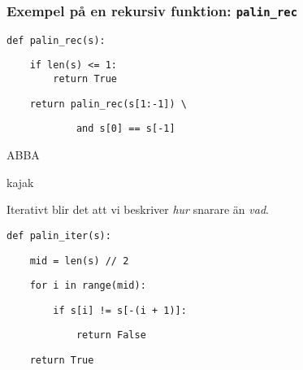 \documentclass{beamer}
\begin{document}
  \begin{frame}[fragile]
    \frametitle{Exempel på en rekursiv funktion: \texttt{palin\_rec}}

    \begin{verbatim}
def palin_rec(s):
    \end{verbatim}
    \vspace{-1.5em}
    \pause{}
    \begin{verbatim}
    if len(s) <= 1:
        return True
    \end{verbatim}
    \vspace{-1.5em}
    \pause{}
    \begin{verbatim}
    return palin_rec(s[1:-1]) \
    \end{verbatim}
    \vspace{-1.5em}
    \pause{}
    \begin{verbatim}
            and s[0] == s[-1]
    \end{verbatim}

    \pause{}

    ABBA

    kajak

  \end{frame}

  \begin{frame}[fragile]

    Iterativt blir det att vi beskriver \emph{hur} snarare än
    \emph{vad}.

    \begin{verbatim}
def palin_iter(s):
    \end{verbatim}
    \vspace{-1.5em}
    \pause{}
    \begin{verbatim}
    mid = len(s) // 2
    \end{verbatim}
    \vspace{-1.5em}
    \pause{}
    \begin{verbatim}
    for i in range(mid):
    \end{verbatim}
    \vspace{-1.5em}
    \pause{}
    \begin{verbatim}
        if s[i] != s[-(i + 1)]:
    \end{verbatim}
    \vspace{-1.5em}
    \pause{}
    \begin{verbatim}
            return False
    \end{verbatim}
    \vspace{-1.5em}
    \pause{}
    \begin{verbatim}
    return True
    \end{verbatim}

  \end{frame}
\end{document}
